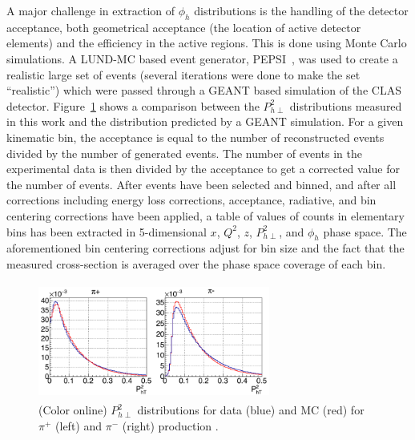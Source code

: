 \documentclass[aps,prl,twocolumn,showpacs,superscriptaddress,groupedaddress]{revtex4-1}  %
\newcommand{\Phperp}{P_{h\perp}}
\begin{document}
A major challenge in extraction of $\phi_h$ distributions is the handling of the detector acceptance, both geometrical acceptance (the location of active detector elements) and the efficiency in the active regions.
This is done using Monte Carlo simulations.
A LUND-MC based event generator, PEPSI~\cite{Mankiewicz:1991dp}, was used to create a realistic large set of events (several iterations were done to make the set ``realistic'') which were passed through a GEANT based simulation of the CLAS detector.
Figure~\ref{fig:pt2_data_mc_comparison} shows a comparison between the $P_{h\perp}^2$ distributions measured in this work and the distribution predicted by a GEANT simulation.
For a given kinematic bin, the acceptance is equal to the number of reconstructed events divided by the number of generated events.
The number of events in the experimental data is then divided by the acceptance to get a corrected value for the number of events.
After events have been selected and binned, and after all corrections including energy loss corrections, acceptance, radiative, and bin centering corrections have been applied, 
a table of values of counts in elementary bins has been extracted in 5-dimensional $x$, $Q^2$, $z$, $\Phperp^2$, and $\phi_h$ phase space.
The aforementioned bin centering corrections adjust for bin size and the fact that the measured cross-section is averaged over the phase space coverage of each bin.
\begin{figure}[htp]
\centering
\includegraphics[width=3.0in,height=1.5in]{plots/pt2_data_mc_comparison.png}
\caption{(Color online) $P_{h\perp}^2$ distributions for data (blue) and MC (red) for $\pi^+$ (left) and $\pi^-$ (right) production .}
\label{fig:pt2_data_mc_comparison}
\end{figure}
\end{document}

